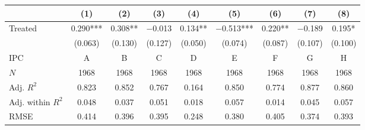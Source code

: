 
\begin{tabular}[t]{lcccccccc}
\toprule
  & (1) & (2) & (3) & (4) & (5) & (6) & (7) & (8)\\
\midrule
Treated & \num{0.290}*** & \num{0.308}** & \num{-0.013} & \num{0.134}** & \num{-0.513}*** & \num{0.220}** & \num{-0.189} & \num{0.195}*\\
 & (\num{0.063}) & (\num{0.130}) & (\num{0.127}) & (\num{0.050}) & (\num{0.074}) & (\num{0.087}) & (\num{0.107}) & (\num{0.100})\\
\midrule
IPC & A & B & C & D & E & F & G & H\\
$N$ & \num{1968} & \num{1968} & \num{1968} & \num{1968} & \num{1968} & \num{1968} & \num{1968} & \num{1968}\\
Adj. $R^2$ & \num{0.823} & \num{0.852} & \num{0.767} & \num{0.164} & \num{0.850} & \num{0.774} & \num{0.877} & \num{0.860}\\
Adj. within $R^2$ & \num{0.048} & \num{0.037} & \num{0.051} & \num{0.018} & \num{0.057} & \num{0.014} & \num{0.045} & \num{0.057}\\
RMSE & \num{0.414} & \num{0.396} & \num{0.395} & \num{0.248} & \num{0.380} & \num{0.405} & \num{0.374} & \num{0.393}\\
\bottomrule
\end{tabular}
